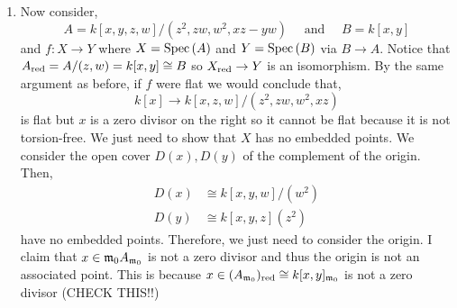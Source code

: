 \documentclass[12pt]{article}
\begin{document}
\begin{enumerate}
\begin{proof}
For any $A/I$-module $M$ we have,
\[ M \otimes_{A/I} B/IB = M \otimes_{A/I} A/I \otimes_A B = M_A \otimes_A B \]
but restriction $M \mapsto M_A$ is exact and $- \otimes_A B$ is exact so $f : A/I \to B/IB$ is flat.
\end{proof}
\noindent
We apply this to $I = (y) \subset A$ then we see that,
\[ k[x] \to k[x,z,w]/(z(x+z), zw, wx, wy) \]
should be flat. However, $xw = 0$ in this ring so the map makes the target not a torsion-free module and therefore it cannot be flat. Therefore $f$ is not flat. We can give an alternative argument as follows. Notice that,
\[ A \cong k[x,y] \times_{k} k[z,w] = \{ (f,g) \in k[x,y] \times k[z,w] \mid f(0,0) = g(0,0) \} \]
Therefore, there is an exact sequence of $B'$-modules,
\begin{center}
\end{center}
From the long exact sequence for $\Tor{i}{B}{k}{-}$ to get an exact sequence,
\begin{center}
\end{center}
but $B^{\oplus 2}$ is free and thus flat and therefore,
\[ \Tor{1}{B}{k}{A} \cong \Tor{2}{B}{k}{k} \cong k \]
Then the Kozul complex $K_\bullet$ is exact giving a free resolution,
\begin{center}
\end{center}
which implies that,
\[ \Tor{2}{B}{k}{k} = H_2(K_\bullet \otimes_B k) = k \]
Therefore, $A$ is not a flat $B$-module.

\item Now consider,
\[ A = k[x,y,z,w]/(z^2, zw, w^2, xz-yw) \quad \text{ and } \quad B = k[x,y] \]
and $f : X \to Y$ where $X = \mathrm{Spec}\left( A \right)$ and $Y = \mathrm{Spec}\left( B \right)$ via $B \to A$. Notice that $A_{\mathrm{red}} = A/(z,w) = k[x,y] \cong B$ so $X_{\mathrm{red}} \to Y$ is an isomorphism. By the same argument as before, if $f$ were flat we would conclude that,
\[ k[x] \to k[x,z,w]/(z^2, zw, w^2, xz) \]
is flat but $x$ is a zero divisor on the right so it cannot be flat because it is not torsion-free. We just need to show that $X$ has no embedded points. We consider the open cover $D(x), D(y)$ of the complement of the origin. Then,
\begin{align*}
D(x) & \cong k[x,y,w]/(w^2)
\\
D(y) & \cong k[x,y,z](z^2)
\end{align*}
have no embedded points. Therefore, we just need to consider the origin. I claim that $x \in \mathfrak{m}_0 A_{\mathfrak{m}_0}$ is not a zero divisor and thus the origin is not an associated point. This is because $x \in (A_{\mathfrak{m}_0})_{\mathrm{red}} \cong k[x,y]_{\mathfrak{m}_0}$ is not a zero divisor (CHECK THIS!!)
\end{enumerate}
\end{document}
